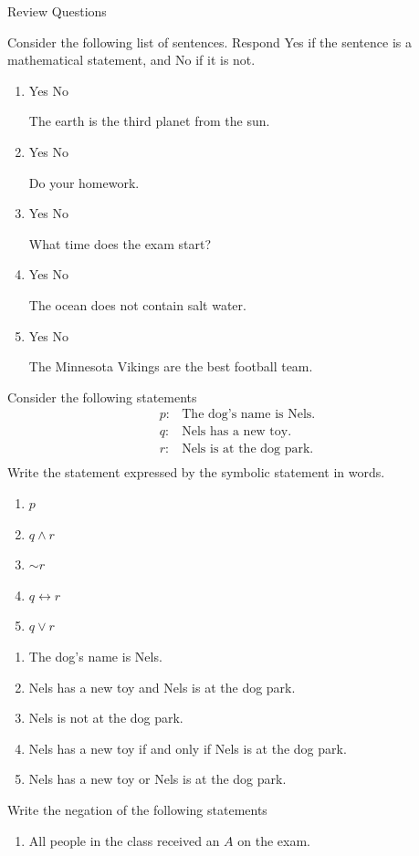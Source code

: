 \documentclass[addpoints,12pt]{exam}
\newcommand{\ynn}{
\begin{oneparcheckboxes}
\choice Yes
\CorrectChoice No
	\end{oneparcheckboxes}
}
\newcommand{\yny}{
\begin{oneparcheckboxes}
\CorrectChoice Yes
\choice No 
	\end{oneparcheckboxes}
}
\theoremstyle{definition}
\begin{document}
\begin{center}
    \Huge Review Questions
\end{center}
\begin{questions}
\question Consider the following list of sentences. Respond Yes if the sentence is a mathematical statement, and No if it is not. 
\begin{enumerate}[label = \alph*)]
	\item \yny The earth is the third planet from the sun.   
	\item \ynn Do your homework. 
	\item \ynn What time does the exam start? 
	\item \yny The ocean does not contain salt water. 
	\item \ynn The Minnesota Vikings are the best football team.  
\end{enumerate}
\question Consider the following statements 
\begin{align*}
	p:  & \text{The dog's name  is Nels.} \\
	q: & \text{Nels has a new toy. } \\
	r: & \text{Nels is at the dog park.} \\
\end{align*}
Write the statement expressed by the symbolic statement in words. 
\begin{enumerate}[label = \alph*)]
    \item $p $ 
		\item $q \wedge r$ 
		\item $\sim r $
		\item $q \leftrightarrow  r $ 
		\item  $q \vee r $
\end{enumerate}
    \begin{enumerate}[label = \alph*)]
        \item The dog's name is Nels. 
				\item Nels has a new toy and Nels is at the dog park. 
				\item Nels is not at the dog park. 
				\item Nels has a new toy if and only if Nels is at the dog park. 
				\item Nels has a new toy or Nels is at the dog park. 
    \end{enumerate}
\question Write the negation of the following statements 
\begin{enumerate}[label = \alph*)]
	\item All people in the class received an $A$ on the exam. 

\end{enumerate}
\end{questions}
\end{document}
